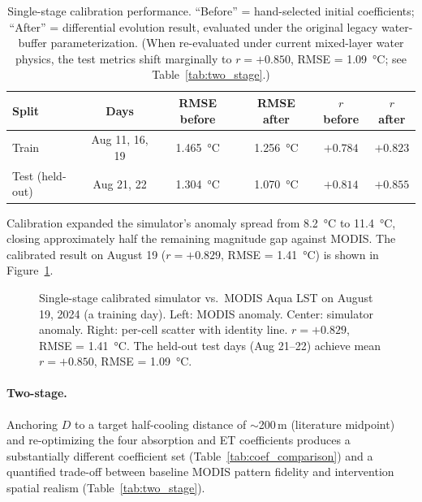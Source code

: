 \documentclass[12pt, letterpaper]{article}
\begin{document}
\begin{table}[ht]
  \centering
  \caption{Single-stage calibration performance. ``Before'' = hand-selected
  initial coefficients; ``After'' = differential evolution result, evaluated
  under the original legacy water-buffer parameterization.
  (When re-evaluated under current mixed-layer water physics, the test
  metrics shift marginally to $r = +0.850$, RMSE = \SI{1.09}{\degreeCelsius};
  see Table~\ref{tab:two_stage}.)}
  \label{tab:calibration}
  \begin{tabular}{lccccc}
    \toprule
    Split & Days & RMSE before & RMSE after & $r$ before & $r$ after \\
    \midrule
    Train & Aug 11, 16, 19
      & \SI{1.465}{\degreeCelsius} & \SI{1.256}{\degreeCelsius}
      & $+0.784$ & $+0.823$ \\
    Test (held-out) & Aug 21, 22
      & \SI{1.304}{\degreeCelsius} & \SI{1.070}{\degreeCelsius}
      & $+0.814$ & $+0.855$ \\
    \bottomrule
  \end{tabular}
\end{table}

Calibration expanded the simulator's anomaly spread from
\SI{8.2}{\degreeCelsius} to \SI{11.4}{\degreeCelsius}, closing approximately
half the remaining magnitude gap against MODIS. The calibrated result on
August 19 ($r = +0.829$, RMSE = \SI{1.41}{\degreeCelsius}) is shown in
Figure~\ref{fig:calibrated}.

\begin{figure}[ht]
  \centering
  \caption{Single-stage calibrated simulator vs.\ MODIS Aqua LST on August 19,
  2024 (a training day). Left: MODIS anomaly. Center: simulator anomaly.
  Right: per-cell scatter with identity line.
  $r = +0.829$, RMSE = \SI{1.41}{\degreeCelsius}. The held-out test days
  (Aug 21–22) achieve mean $r = +0.850$, RMSE = \SI{1.09}{\degreeCelsius}.}
  \label{fig:calibrated}
\end{figure}

\paragraph{Two-stage.}
Anchoring $D$ to a target half-cooling distance of $\sim$200\,m
(literature midpoint) and re-optimizing the four absorption and ET
coefficients produces a substantially different coefficient set
(Table~\ref{tab:coef_comparison}) and a quantified trade-off between
baseline MODIS pattern fidelity and intervention spatial realism
(Table~\ref{tab:two_stage}).
\end{document}
